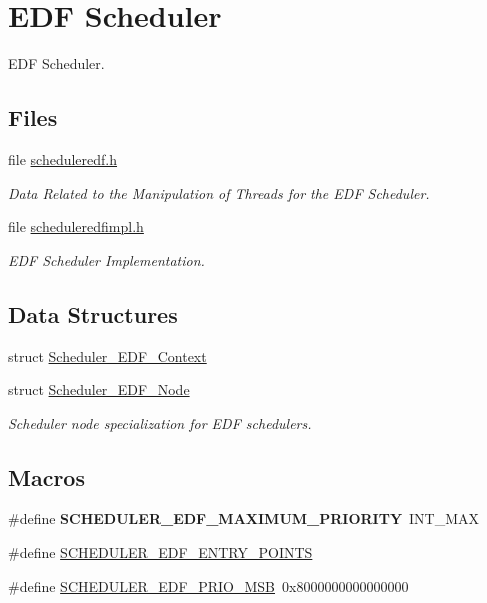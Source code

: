 \hypertarget{group__RTEMSScoreSchedulerEDF}{}\section{E\+DF Scheduler}
\label{group__RTEMSScoreSchedulerEDF}


E\+DF Scheduler.  


\subsection*{Files}
\begin{DoxyCompactItemize}
\item 
file \mbox{\hyperlink{scheduleredf_8h}{scheduleredf.\+h}}
\begin{DoxyCompactList}\small\item\em Data Related to the Manipulation of Threads for the E\+DF Scheduler. \end{DoxyCompactList}\item 
file \mbox{\hyperlink{scheduleredfimpl_8h}{scheduleredfimpl.\+h}}
\begin{DoxyCompactList}\small\item\em E\+DF Scheduler Implementation. \end{DoxyCompactList}\end{DoxyCompactItemize}
\subsection*{Data Structures}
\begin{DoxyCompactItemize}
\item 
struct \mbox{\hyperlink{structScheduler__EDF__Context}{Scheduler\+\_\+\+E\+D\+F\+\_\+\+Context}}
\item 
struct \mbox{\hyperlink{structScheduler__EDF__Node}{Scheduler\+\_\+\+E\+D\+F\+\_\+\+Node}}
\begin{DoxyCompactList}\small\item\em Scheduler node specialization for E\+DF schedulers. \end{DoxyCompactList}\end{DoxyCompactItemize}
\subsection*{Macros}
\begin{DoxyCompactItemize}
\item 
\mbox{\label{group__RTEMSScoreSchedulerEDF_ga0f176d651f1b6fd8de1a269ebe3bf208}} 
\#define {\bfseries S\+C\+H\+E\+D\+U\+L\+E\+R\+\_\+\+E\+D\+F\+\_\+\+M\+A\+X\+I\+M\+U\+M\+\_\+\+P\+R\+I\+O\+R\+I\+TY}~I\+N\+T\+\_\+\+M\+AX
\item 
\#define \mbox{\hyperlink{group__RTEMSScoreSchedulerEDF_ga348e7e95a0d6fd2e7c3e657a812a8c18}{S\+C\+H\+E\+D\+U\+L\+E\+R\+\_\+\+E\+D\+F\+\_\+\+E\+N\+T\+R\+Y\+\_\+\+P\+O\+I\+N\+TS}}
\item 
\#define \mbox{\hyperlink{group__RTEMSScoreSchedulerEDF_ga576b01a08743b7a0f261b145c890dbd2}{S\+C\+H\+E\+D\+U\+L\+E\+R\+\_\+\+E\+D\+F\+\_\+\+P\+R\+I\+O\+\_\+\+M\+SB}}~0x8000000000000000
\end{DoxyCompactItemize}
